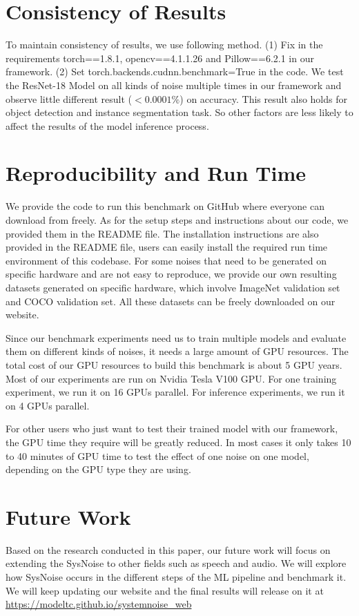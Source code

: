 \section{Consistency of Results}
\label{error bar}
To maintain consistency of results, we use following method. (1) Fix in the requirements torch==1.8.1, opencv==4.1.1.26 and Pillow==6.2.1 in our framework. (2) Set torch.backends.cudnn.benchmark=True in the code.
We test the ResNet-18 Model on all kinds of noise multiple times in our framework and observe little different result ($<0.0001\%$) on accuracy. This result also holds for object detection and instance segmentation task. So other factors are less likely to affect the results of the model inference process. 


\section{Reproducibility and Run Time}
\label{computing_resources}
We provide the code to run this benchmark on GitHub where everyone can download from freely. As for the setup steps and instructions about our code, we provided them in the README file. The installation instructions are also provided in the README file, users can easily install the required run time environment of this codebase. For some noises that need to be generated on specific hardware and are not easy to reproduce, we provide our own resulting datasets generated on specific hardware, which involve ImageNet validation set and COCO validation set. All these datasets can be freely downloaded on our website.


Since our benchmark experiments need us to train multiple models and evaluate them on different kinds of noises, it needs a large amount of GPU resources. The total cost of our GPU resources to build this benchmark is about 5 GPU years. Most of our experiments are run on  Nvidia Tesla V100 GPU. For one training experiment, we run it on 16 GPUs parallel. For inference experiments, we run it on 4 GPUs parallel.

For other users who just want to test their trained model with our framework, the GPU time they require will be greatly reduced. In most cases it only takes 10 to 40 minutes of GPU time to test the effect of one noise on one model, depending on the GPU type they are using.

\section{Future Work}
Based on the research conducted in this paper, our future work will focus on extending the SysNoise to other fields such as speech and audio. We will explore how SysNoise occurs in the different steps of the ML pipeline and benchmark it. We will keep updating our website and the final results will release on it at \url{https://modeltc.github.io/systemnoise_web}


